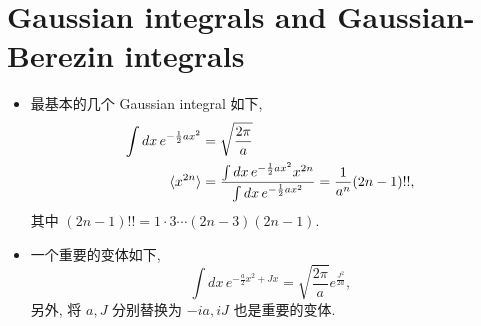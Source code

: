 \chapter{Gaussian integrals and Gaussian-Berezin integrals}
\begin{itemize}
	\item 最基本的几个 Gaussian integral 如下,
	\begin{align}
		\int dx \, e^{- \frac{1}{2} a x^2} &= \sqrt{\frac{2 \pi}{a}} \\
		\braket{x^{2 n}} &= \frac{\int dx \, e^{- \frac{1}{2} a x^2} x^{2 n}}{\int dx \, e^{- \frac{1}{2} a x^2}} = \frac{1}{a^n} (2 n - 1)!!, \label{B.0.2}
	\end{align}
	其中 $(2 n - 1)!! = 1 \cdot 3 \cdots (2 n - 3) (2 n - 1)$.
	
	\item 一个重要的变体如下,
	\begin{equation}
		\int dx \, e^{- \frac{a}{2} x^2 + J x} = \sqrt{\frac{2 \pi}{a}} e^{\frac{J^2}{2 a}},
	\end{equation}
	另外, 将 $a, J$ 分别替换为 $- i a, i J$ 也是重要的变体.
\end{itemize}

